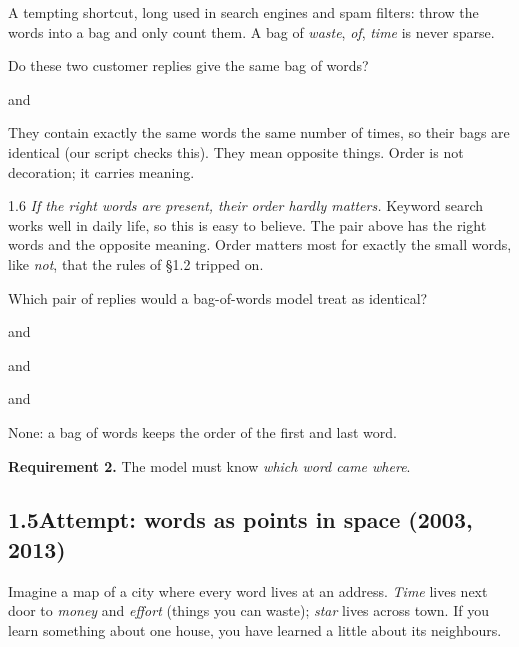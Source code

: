 A tempting shortcut, long used in search engines and spam filters: throw the words into a bag and only count
them. A bag of \emph{waste}, \emph{of}, \emph{time} is never sparse.

\Predict Do these two customer replies give the same bag of words?
\begin{center}
 \qquad and \qquad {}
\end{center}
They contain exactly the same words the same number of times, so their bags are identical (our script checks
this). They mean opposite things. Order is not decoration; it carries meaning.

\begin{wrongidea}{1.6}
\emph{If the right words are present, their order hardly matters.} Keyword search works well in daily life, so
this is easy to believe. The pair above has the right words and the opposite meaning. Order matters most for
exactly the small words, like \emph{not}, that the rules of \S1.2 tripped on.
\end{wrongidea}

\begin{checkq}
Which pair of replies would a bag-of-words model treat as identical?
\begin{options}
\item {} and 
\item {} and 
\item {} and 
\item None: a bag of words keeps the order of the first and last word.
\end{options}
\end{checkq}

\begin{sidebar}
\textbf{Requirement 2.} The model must know \emph{which word came where}.
\end{sidebar}


\subsection*{1.5\quad Attempt: words as points in space (2003, 2013)}

\Picture Imagine a map of a city where every word lives at an address. \emph{Time} lives next door to
\emph{money} and \emph{effort} (things you can waste); \emph{star} lives across town. If you learn something
about one house, you have learned a little about its neighbours.

